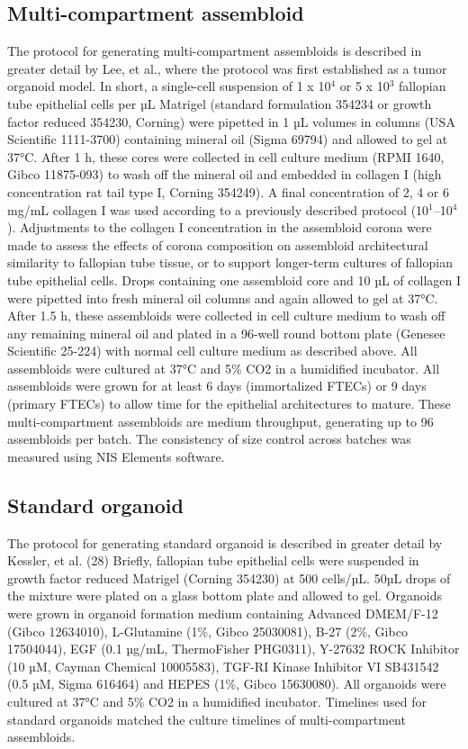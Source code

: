 \begin{refsection}
    \subsection{Multi-compartment assembloid}
    The protocol for generating multi-compartment assembloids is described in greater detail by Lee, et al., where the protocol was first established as a tumor organoid model\cite{lee2022a}. In short, a single-cell suspension of 1 x 10$^4$ or 5 x 10$^3$ fallopian tube epithelial cells per µL Matrigel (standard formulation 354234 or growth factor reduced 354230, Corning) were pipetted in 1 µL volumes in columns (USA Scientific 1111-3700) containing mineral oil (Sigma 69794) and allowed to gel at 37°C. After 1 h, these cores were collected in cell culture medium (RPMI 1640, Gibco 11875-093) to wash off the mineral oil and embedded in collagen I (high concentration rat tail type I, Corning 354249). A final concentration of 2, 4 or 6 mg/mL collagen I was used according to a previously described protocol (10$^1$–10$^4$). Adjustments to the collagen I concentration in the assembloid corona were made to assess the effects of corona composition on assembloid architectural similarity to fallopian tube tissue, or to support longer-term cultures of fallopian tube epithelial cells.  Drops containing one assembloid core and 10 µL of collagen I were pipetted into fresh mineral oil columns and again allowed to gel at 37°C. After 1.5 h, these assembloids were collected in cell culture medium to wash off any remaining mineral oil and plated in a 96-well round bottom plate (Genesee Scientific 25-224) with normal cell culture medium as described above. All assembloids were cultured at 37°C and 5\% CO2 in a humidified incubator. All assembloids were grown for at least 6 days (immortalized FTECs) or 9 days (primary FTECs) to allow time for the epithelial architectures to mature. These multi-compartment assembloids are medium throughput, generating up to 96 assembloids per batch.  The consistency of size control across batches was measured using NIS Elements software.
    
    \subsection{Standard organoid}
    The protocol for generating standard organoid is described in greater detail by Kessler, et al. (28) Briefly, fallopian tube epithelial cells were suspended in growth factor reduced Matrigel (Corning 354230) at 500 cells/µL. 50µL drops of the mixture were plated on a glass bottom plate and allowed to gel. Organoids were grown in organoid formation medium containing Advanced DMEM/F-12 (Gibco 12634010), L-Glutamine (1\%, Gibco 25030081), B-27 (2\%, Gibco 17504044), EGF (0.1 µg/mL, ThermoFisher PHG0311), Y-27632 ROCK Inhibitor (10 µM, Cayman Chemical 10005583), TGF-\textbeta RI Kinase Inhibitor VI SB431542 (0.5 µM, Sigma 616464) and HEPES (1\%, Gibco 15630080). All organoids were cultured at 37°C and 5\% CO2 in a humidified incubator. Timelines used for standard organoids matched the culture timelines of multi-compartment assembloids.

\end{refsection}
